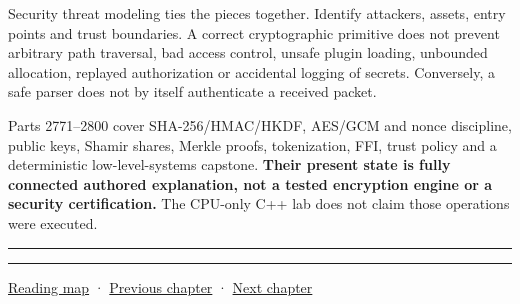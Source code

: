 Security threat modeling ties the pieces together. Identify attackers, assets, entry points and trust boundaries. A correct cryptographic primitive does not prevent arbitrary path traversal, bad access control, unsafe plugin loading, unbounded allocation, replayed authorization or accidental logging of secrets. Conversely, a safe parser does not by itself authenticate a received packet.

Parts 2771--2800 cover SHA-256/HMAC/HKDF, AES/GCM and nonce discipline, public keys, Shamir shares, Merkle proofs, tokenization, FFI, trust policy and a deterministic low-level-systems capstone. \textbf{Their present state is fully connected authored explanation, not a tested encryption engine or a security certification.} The CPU-only C++ lab does not claim those operations were executed.

\begin{center}\rule{0.5\linewidth}{0.5pt}\end{center}

\begin{center}\rule{0.5\linewidth}{0.5pt}\end{center}

\href{Chapter\%20Edition/01\%20-\%20Computing\%20Foundations/00\%20-\%20Reading\%20Map}{Reading map} · \hyperref[01-foundations-i-ch015]{Previous chapter} · \hyperref[01-foundations-i-ch017]{Next chapter}
